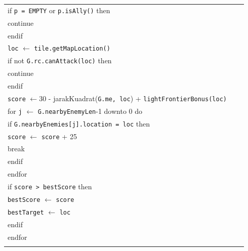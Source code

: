 \documentclass{article}
\newenvironment{pseudobox}
{
\centering
\begin{longtable}{|p{0.94\linewidth}|}
\hline
}
{
\\ \hline
\end{longtable}
\vspace{0.05cm}
}
\begin{document}
\begin{enumerate}[label=\alph*.]
\begin{enumerate}[label=\alph*.]
\begin{pseudobox}
\hspace*{3em}if \texttt{p = EMPTY} or \texttt{p.isAlly()} then \\
\hspace*{4.5em}continue \\
\hspace*{3em}endif \\

\hspace*{3em}\texttt{loc} $\leftarrow$ \texttt{tile.getMapLocation()} \\
\hspace*{3em}if not \texttt{G.rc.canAttack(loc)} then \\
\hspace*{4.5em}continue \\
\hspace*{3em}endif \\

\hspace*{3em}\texttt{score} $\leftarrow 30$ - jarakKuadrat(\texttt{G.me, loc}) + \texttt{lightFrontierBonus(loc)} \\

\hspace*{3em}for \texttt{j} $\leftarrow$ \texttt{G.nearbyEnemyLen}-1 downto 0 do \\
\hspace*{4.5em}if \texttt{G.nearbyEnemies[j].location = loc} then \\
\hspace*{6em}\texttt{score} $\leftarrow$ \texttt{score} + 25 \\
\hspace*{6em}break \\
\hspace*{4.5em}endif \\
\hspace*{3em}endfor \\

\hspace*{3em}if \texttt{score > bestScore} then \\
\hspace*{4.5em}\texttt{bestScore} $\leftarrow$ \texttt{score} \\
\hspace*{4.5em}\texttt{bestTarget} $\leftarrow$ \texttt{loc} \\
\hspace*{3em}endif \\
\hspace*{1.5em}endfor \\


\end{pseudobox}
\end{enumerate}
\end{enumerate}
\end{document}
